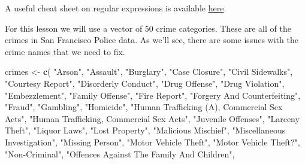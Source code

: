 \documentclass[
  12pt,
]{book}
\newenvironment{Shaded}{\begin{snugshade}}{\end{snugshade}}
\newcommand{\KeywordTok}[1]{\textcolor[rgb]{0.27,0.27,0.27}{\textbf{#1}}}
\newcommand{\NormalTok}[1]{#1}
\newcommand{\StringTok}[1]{\textcolor[rgb]{0.5,0.5,0.5}{#1}}
\begin{document}
A useful cheat sheet on regular expressions is available \href{https://www.rstudio.com/wp-content/uploads/2016/09/RegExCheatsheet.pdf}{here}.

For this lesson we will use a vector of 50 crime categories. These are all of the crimes in San Francisco Police data. As we'll see, there are some issues with the crime names that we need to fix.

\begin{Shaded}
\begin{Highlighting}[]
\NormalTok{crimes \textless{}{-}}\StringTok{ }\KeywordTok{c}\NormalTok{(}
  \StringTok{"Arson"}\NormalTok{,}
  \StringTok{"Assault"}\NormalTok{,                                  }
  \StringTok{"Burglary"}\NormalTok{,                                 }
  \StringTok{"Case Closure"}\NormalTok{,                             }
  \StringTok{"Civil Sidewalks"}\NormalTok{,                          }
  \StringTok{"Courtesy Report"}\NormalTok{,                          }
  \StringTok{"Disorderly Conduct"}\NormalTok{,                       }
  \StringTok{"Drug Offense"}\NormalTok{,                             }
  \StringTok{"Drug Violation"}\NormalTok{,                           }
  \StringTok{"Embezzlement"}\NormalTok{,                             }
  \StringTok{"Family Offense"}\NormalTok{,                           }
  \StringTok{"Fire Report"}\NormalTok{,                              }
  \StringTok{"Forgery And Counterfeiting"}\NormalTok{,               }
  \StringTok{"Fraud"}\NormalTok{,                                    }
  \StringTok{"Gambling"}\NormalTok{,                                 }
  \StringTok{"Homicide"}\NormalTok{,                                 }
  \StringTok{"Human Trafficking (A), Commercial Sex Acts"}\NormalTok{,}
  \StringTok{"Human Trafficking, Commercial Sex Acts"}\NormalTok{,   }
  \StringTok{"Juvenile Offenses"}\NormalTok{,                        }
  \StringTok{"Larceny Theft"}\NormalTok{,                            }
  \StringTok{"Liquor Laws"}\NormalTok{,                              }
  \StringTok{"Lost Property"}\NormalTok{,                            }
  \StringTok{"Malicious Mischief"}\NormalTok{,                       }
  \StringTok{"Miscellaneous Investigation"}\NormalTok{,              }
  \StringTok{"Missing Person"}\NormalTok{,                           }
  \StringTok{"Motor Vehicle Theft"}\NormalTok{,                      }
  \StringTok{"Motor Vehicle Theft?"}\NormalTok{,                     }
  \StringTok{"Non{-}Criminal"}\NormalTok{,                             }
  \StringTok{"Offences Against The Family And Children"}\NormalTok{, }

\end{Highlighting}
\end{Shaded}
\end{document}
